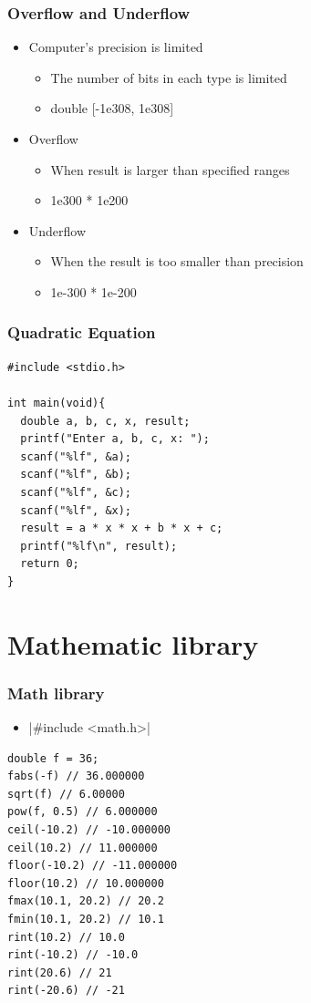 \documentclass{../c-lecture}
\begin{document}
\begin{frame}
  \frametitle{Overflow and Underflow}
  \begin{itemize}
    \item Computer's precision is limited
    \begin{itemize}
      \item
        {\color{Orange} The number of bits} in each type is
        limited
      \item double [-1e308, 1e308]
    \end{itemize}
    \item Overflow
    \begin{itemize}
      \item When result is larger than specified ranges
      \item 1e300 * 1e200
    \end{itemize}
    \item Underflow
    \begin{itemize}
      \item When the result is too smaller than precision
      \item 1e-300 * 1e-200
    \end{itemize}
  \end{itemize}
\end{frame}

\begin{frame}[fragile]
  \frametitle{Quadratic Equation}
  \begin{verbatim}
#include <stdio.h>

int main(void){
  double a, b, c, x, result;
  printf("Enter a, b, c, x: ");
  scanf("%lf", &a);
  scanf("%lf", &b);
  scanf("%lf", &c);
  scanf("%lf", &x);
  result = a * x * x + b * x + c;
  printf("%lf\n", result);
  return 0;
}
  \end{verbatim}
\end{frame}

\section{Mathematic library}

\begin{frame}[fragile]
  \frametitle{Math library}
  \begin{itemize}
    \item {}|#include <math.h>|
  \end{itemize}
  \scriptsize
  \begin{verbatim}
double f = 36;
fabs(-f) // 36.000000
sqrt(f) // 6.00000
pow(f, 0.5) // 6.000000
ceil(-10.2) // -10.000000
ceil(10.2) // 11.000000
floor(-10.2) // -11.000000
floor(10.2) // 10.000000
fmax(10.1, 20.2) // 20.2
fmin(10.1, 20.2) // 10.1
rint(10.2) // 10.0
rint(-10.2) // -10.0
rint(20.6) // 21
rint(-20.6) // -21
  \end{verbatim}
\end{frame}
\end{document}
